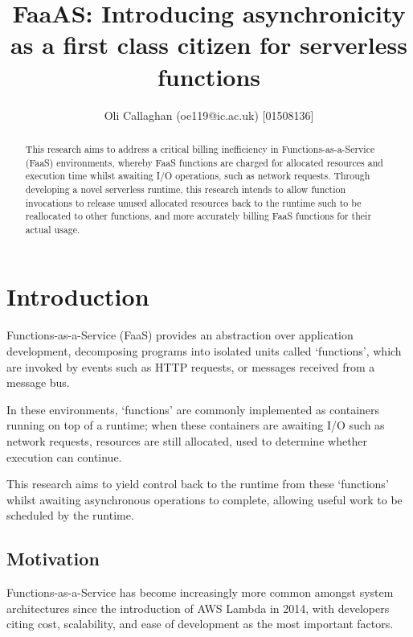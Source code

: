 \documentclass[a4paper,twocolumn]{article}
\title{\textbf{FaaAS: Introducing asynchronicity as a first class citizen for serverless functions}}
\author{Oli Callaghan (oe119@ic.ac.uk) [01508136]}
\begin{document}
\newcommand{\faas}{FaaS}
\newcommand{\faaslong}{Functions-as-a-Service}
\newcommand{\faasxlong}{\faaslong{} (\faas{})}

\maketitle

\begin{abstract}
    This research aims to address a critical billing inefficiency in \faasxlong{} environments, whereby \faas{} functions are charged for allocated resources and execution time whilst awaiting I/O operations, such as network requests. Through developing a novel serverless runtime, this research intends to allow function invocations to release unused allocated resources back to the runtime such to be reallocated to other functions, and more accurately billing \faas{} functions for their actual usage.
\end{abstract}

\tableofcontents

\section{Introduction}

\faasxlong{} provides an abstraction over application development, decomposing programs into isolated units called `functions', which are invoked by events such as HTTP requests, or messages received from a message bus.

In these environments, `functions' are commonly implemented as containers running on top of a runtime; when these containers are awaiting I/O such as network requests, resources are still allocated, used to determine whether execution can continue.

This research aims to yield control back to the runtime from these `functions' whilst awaiting asynchronous operations to complete, allowing useful work to be scheduled by the runtime.

\subsection{Motivation}
\faaslong{} has become increasingly more common amongst system architectures since the introduction of AWS Lambda\cite{aws-lambda} in 2014, with developers citing cost, scalability, and ease of development as the most important factors\cite{review-of-serverless-use-cases-and-characteristics}.
\end{document}
